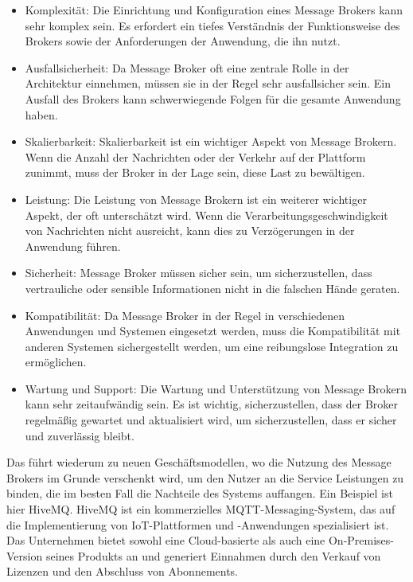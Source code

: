 \documentclass[../vs-script-first-v01.tex]{subfiles}
\begin{document}
\begin{itemize}
\item Komplexität: Die Einrichtung und Konfiguration eines Message Brokers kann sehr komplex sein. Es erfordert ein tiefes Verständnis der Funktionsweise des Brokers sowie der Anforderungen der Anwendung, die ihn nutzt.
\item Ausfallsicherheit: Da Message Broker oft eine zentrale Rolle in der Architektur einnehmen, müssen sie in der Regel sehr ausfallsicher sein. Ein Ausfall des Brokers kann schwerwiegende Folgen für die gesamte Anwendung haben.
\item Skalierbarkeit: Skalierbarkeit ist ein wichtiger Aspekt von Message Brokern. Wenn die Anzahl der Nachrichten oder der Verkehr auf der Plattform zunimmt, muss der Broker in der Lage sein, diese Last zu bewältigen.
\item Leistung: Die Leistung von Message Brokern ist ein weiterer wichtiger Aspekt, der oft unterschätzt wird. Wenn die Verarbeitungsgeschwindigkeit von Nachrichten nicht ausreicht, kann dies zu Verzögerungen in der Anwendung führen.
\item Sicherheit: Message Broker müssen sicher sein, um sicherzustellen, dass vertrauliche oder sensible Informationen nicht in die falschen Hände geraten.
\item Kompatibilität: Da Message Broker in der Regel in verschiedenen Anwendungen und Systemen eingesetzt werden, muss die Kompatibilität mit anderen Systemen sichergestellt werden, um eine reibungslose Integration zu ermöglichen.
\item Wartung und Support: Die Wartung und Unterstützung von Message Brokern kann sehr zeitaufwändig sein. Es ist wichtig, sicherzustellen, dass der Broker regelmäßig gewartet und aktualisiert wird, um sicherzustellen, dass er sicher und zuverlässig bleibt.
\end{itemize}
Das führt wiederum zu neuen Geschäftsmodellen, wo die Nutzung des Message Brokers im Grunde verschenkt wird, um den Nutzer an die Service Leistungen zu binden, die im besten Fall die Nachteile des Systems auffangen. 
Ein Beispiel ist hier HiveMQ. HiveMQ ist ein kommerzielles MQTT-Messaging-System, das auf die Implementierung von IoT-Plattformen und -Anwendungen spezialisiert ist. Das Unternehmen bietet sowohl eine Cloud-basierte als auch eine On-Premises-Version seines Produkts an und generiert Einnahmen durch den Verkauf von Lizenzen und den Abschluss von Abonnements.
\end{document}
